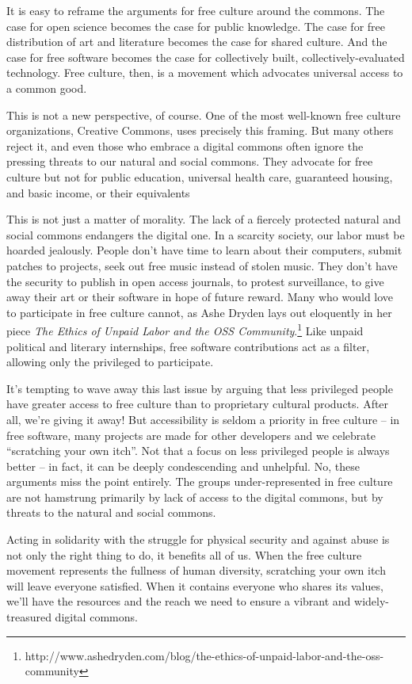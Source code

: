 It is easy to reframe the arguments for free culture around the commons.
The case for open science becomes the case for public knowledge. The
case for free distribution of art and literature becomes the case for
shared culture. And the case for free software becomes the case for
collectively built, collectively-evaluated technology. Free culture,
then, is a movement which advocates universal access to a common good.

This is not a new perspective, of course. One of the most well-known
free culture organizations, Creative Commons, uses precisely this
framing. But many others reject it, and even those who embrace a digital
commons often ignore the pressing threats to our natural and social
commons. They advocate for free culture but not for public education,
universal health care, guaranteed housing, and basic income, or their
equivalents

This is not just a matter of morality. The lack of a fiercely protected
natural and social commons endangers the digital one. In a scarcity
society, our labor must be hoarded jealously. People don't have time to
learn about their computers, submit patches to projects, seek out free
music instead of stolen music. They don't have the security to publish
in open access journals, to protest surveillance, to give away their art
or their software in hope of future reward. Many who would love to
participate in free culture cannot, as Ashe Dryden lays out eloquently
in her piece \emph{The Ethics of Unpaid Labor and the OSS
Community}.\footnote{http://www.ashedryden.com/blog/the-ethics-of-unpaid-labor-and-the-oss-community}
Like unpaid political and literary internships, free software
contributions act as a filter, allowing only the privileged to
participate.

It's tempting to wave away this last issue by arguing that less
privileged people have greater access to free culture than to
proprietary cultural products. After all, we're giving it away! But
accessibility is seldom a priority in free culture -- in free software,
many projects are made for other developers and we celebrate
``scratching your own itch''. Not that a focus on less privileged people
is always better -- in fact, it can be deeply condescending and
unhelpful. No, these arguments miss the point entirely. The groups
under-represented in free culture are not hamstrung primarily by lack of
access to the digital commons, but by threats to the natural and social
commons.

Acting in solidarity with the struggle for physical security and against
abuse is not only the right thing to do, it benefits all of us. When the
free culture movement represents the fullness of human diversity,
scratching your own itch will leave everyone satisfied. When it contains
everyone who shares its values, we'll have the resources and the reach
we need to ensure a vibrant and widely-treasured digital commons.

